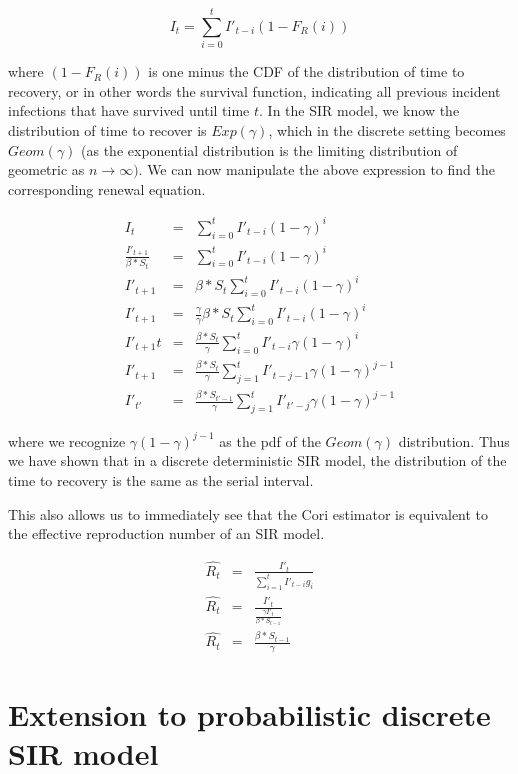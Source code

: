\documentclass{umassthesis}          %
\begin{document}
\begin{equation}
I_t = \sum_{i=0}^t I'_{t-i} (1-F_R(i))
\end{equation}

where $(1-F_R(i))$ is one minus the CDF of the distribution of time to recovery, or in other words the survival function, indicating all previous incident infections that have survived until time $t$. In the SIR model, we know the distribution of time to recover is $Exp(\gamma)$, which in the discrete setting becomes $Geom(\gamma)$ (as the exponential distribution is the limiting distribution of geometric as $n \rightarrow \infty)$. We can now manipulate the above expression to find the corresponding renewal equation.

\begin{eqnarray}
I_t &=& \sum_{i=0}^t I'_{t-i} (1-\gamma)^i\\
\frac{I'_{t+1}}{\beta*S_{t}} &=& \sum_{i=0}^t I'_{t-i} (1-\gamma)^i\\
I'_{t+1} &=& \beta*S_{t}\sum_{i=0}^t I'_{t-i} (1-\gamma)^i\\
I'_{t+1} &=& \frac{\gamma}{\gamma} \beta*S_{t}\sum_{i=0}^t I'_{t-i} (1-\gamma)^i\\
I'_{t+1}t &=& \frac{ \beta*S_{t}}{\gamma}\sum_{i=0}^t I'_{t-i} \gamma(1-\gamma)^i\\
I'_{t+1} &=& \frac{ \beta*S_{t}}{\gamma}\sum_{j=1}^t I'_{t-j-1} \gamma(1-\gamma)^{j-1}\\
I'_{t'} &=& \frac{ \beta*S_{t'-1}}{\gamma} \sum_{j=1}^t I'_{t'-j} \gamma(1-\gamma)^{j-1}
\end{eqnarray}

where we recognize  $\gamma(1-\gamma)^{j-1}$ as the pdf of the $Geom(\gamma)$ distribution. Thus we have shown that in a discrete deterministic SIR model, the distribution of the time to recovery is the same as the serial interval. 

This also allows us to immediately see that the Cori estimator is equivalent to the effective reproduction number of an SIR model. 

\begin{eqnarray}
\hat{R_t} &=& \frac{I'_t}{\sum_{i=1}^t I'_{t-i} g_i}\\
\hat{R_t} &=& \frac{I'_t}{\frac{\gamma I'_t }{\beta*S_{t-1}}}\\
\hat{R_t} &=& \frac{\beta*S_{t-1}}{\gamma}
\end{eqnarray}

\section{Extension to probabilistic discrete SIR model}
\end{document}
